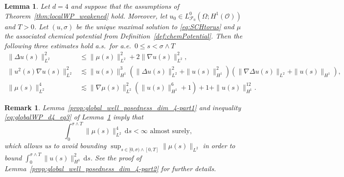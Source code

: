 \documentclass[reqno]{amsart}
\newtheorem{lemma}[Satz]{Lemma}
\newtheorem{remark}[Satz]{Remark}
\newcommand{\F}{\mathscr{F}}
\newcommand{\sO}{\mathscr{O}}
\newcommand{\1}{\mathbf{1}}
\newcommand{\grad}{\nabla}
\newcommand{\ds}{\,\mathrm{d}s}
\begin{document}
\begin{lemma} \label{lem:globalWP_d4_claims}
	Let $d=4$ and suppose that the assumptions of Theorem~\ref{thm:localWP_weakened} hold. Moreover, let $u_0\in L^0_{\F_0}(\Omega;H^1(\sO))$ and $T>0$. Let $(u,\sigma)$ be the unique maximal solution to \eqref{eq:SCHtorus} and $\mu$ the associated chemical potential from Definition~\ref{def:chemPotential}. Then the following three estimates hold a.s.\ for a.e.\ $0\le s <\sigma \land T$
    \begin{align}
        \|\Delta u(s)\|_{L^2}^2  & \le \|\mu(s)\|_{L^2}^2 + 2\| \grad u(s)\|_{L^2}^2 \label{eq:globalWP_d4_eq1}, \\
         \|u^2(s)\nabla u(s)\|_{L^2}^2 & \lesssim
        \|u(s)\|^3_{H^1}
        \left(\|\Delta u(s)\|_{L^2}^2
        +\|u(s)\|^2_{H^1}  \right)
        \left( \|\grad \Delta u(s)\|_{L^2}
        +\|u(s)\|_{H^1}\right),
        \label{eq:globalWP_d4_eq2} \\
        \|\mu(s)\|_{L^2}^4 & \lesssim \|\nabla\mu(s)\|_{L^2}^2 \left(\|u(s)\|_{H^1}^6 + 1\right) + 1
        + \|u(s)\|_{H^1}^{12}. \label{eq:globalWP_d4_eq3}
    \end{align}
\end{lemma}
\begin{remark}
Lemma~\ref{prop:global_well_posedness_dim_4-part1} and inequality \eqref{eq:globalWP_d4_eq3} of Lemma~\ref{lem:globalWP_d4_claims} imply that
\begin{equation*}
\int_0^{\sigma\wedge T} \|\mu(s)\|^4_{L^2} \ds<\infty \text{ almost surely,}
\end{equation*}
which allows us to avoid bounding
$\sup_{s\in[0,\sigma)\wedge[0,T]}\|\mu(s)\|_{L^2}$ in order to bound $\int_0^{\sigma\wedge T} \|u(s)\|^2_{H^3} \ds$. See the proof of Lemma~\ref{prop:global_well_posedness_dim_4-part2} for further details.
\end{remark}
\end{document}
